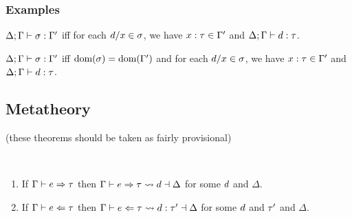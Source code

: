 {\color{gray}\blindtext}
{\color{gray}\blindtext}
{\color{gray}\blindtext}
{\color{gray}\blindtext}
{\color{gray}\blindtext}

\subsubsection{Examples}






  \begin{definition}
    $\Delta; \Gamma \vdash \sigma : \Gamma'$ iff for each $d/x \in \sigma$, we have $x : \tau \in \Gamma'$ and $\Delta; \Gamma \vdash d : \tau$.
  \end{definition}


  \begin{definition}
    $\Delta; \Gamma \vdash \sigma : \Gamma'$ iff $\text{dom}(\sigma) = \text{dom}(\Gamma')$ and for each $d/x \in \sigma$, we have $x : \tau \in \Gamma'$ and $\Delta; \Gamma \vdash d : \tau$.
  \end{definition}








\clearpage
\subsection{Metatheory }

(these theorems should be taken as fairly provisional)

\begin{theorem}[Expandability \cy{??}] ~
  \begin{enumerate}
    \item If $\Gamma \vdash e \Rightarrow \tau$ then $\Gamma \vdash e \Rightarrow \tau \leadsto d \dashv \Delta$ for some $d$ and $\Delta$.
    \item If $\Gamma \vdash e \Leftarrow \tau$ then $\Gamma \vdash e \Leftarrow \tau \leadsto d : \tau' \dashv \Delta$ for some $d$ and $\tau'$ and $\Delta$.
  \end{enumerate}
\end{theorem}

